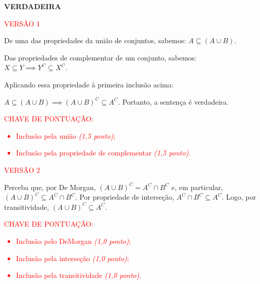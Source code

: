 \textbf{VERDADEIRA}

\textcolor{red}{ VERSÃO 1 } %


De uma das propriedades da união de conjuntos, sabemos: $A \subseteq (A \cup
    B)$.

Das propriedades de complementar de um conjunto, sabemos: $X \subseteq Y
    \implies Y^C \subseteq X^C$.

Aplicando essa propriedade à primeira inclusão acima:

$A \subseteq (A \cup B) \implies (A \cup B)^{C} \subseteq A^{C}$.
Portanto, a sentença é verdadeira.

\bigskip

\textcolor{red}{CHAVE DE PONTUAÇÃO:
    \begin{itemize}
        \item  Inclusão pela união \emph{(1,5 ponto)};
        \item  Inclusão pela propriedade de complementar \emph{(1,5 ponto)}.
    \end{itemize} }

\bigskip

\textcolor{red}{ VERSÃO 2} %

Perceba que, por De Morgan, $(A \cup B)^C = A^C\cap B^C$ e, em particular, $(A
    \cup B)^C \subseteq A^C\cap B^C$. Por propriedade de interseção, $A^C\cap
    B^C\subseteq A^C$. Logo, por transitividade, $(A \cup B)^C \subseteq A^C.$

\bigskip



\textcolor{red}{CHAVE DE PONTUAÇÃO:
    \begin{itemize}
        \item  Inclusão pelo DeMorgan \emph{(1,0 ponto)};
        \item  Inclusão pela interseção \emph{(1,0 ponto)};
        \item  Inclusão pela transitividade \emph{(1,0 ponto)}.
    \end{itemize} }